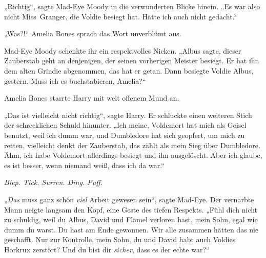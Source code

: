 „Richtig“, sagte Mad-Eye Moody in die verwunderten Blicke hinein.
„Es war also nicht Miss~Granger, die Voldie besiegt hat. Hätte ich auch nicht gedacht.“

„Was?!“ Amelia Bones sprach das Wort unverblümt aus.

Mad-Eye Moody schenkte ihr ein respektvolles Nicken.
„Albus sagte, dieser Zauberstab geht an denjenigen, der seinen vorherigen Meister besiegt. Er hat ihn dem alten Grindie abgenommen, das hat er getan. Dann besiegte Voldie Albus, gestern. Muss ich es buchstabieren, Amelia?“

Amelia Bones starrte Harry mit weit offenem Mund an.

„Das ist vielleicht nicht richtig“, sagte Harry. Er schluckte einen weiteren Stich der schrecklichen Schuld hinunter.
„Ich meine, Voldemort hat mich als Geisel benutzt, weil ich dumm war, und Dumbledore hat sich geopfert, um mich zu retten, vielleicht denkt der Zauberstab, das zählt als mein Sieg über Dumbledore. Ähm, ich habe Voldemort allerdings besiegt und ihn ausgelöscht. Aber ich glaube, es ist besser, wenn niemand weiß, dass ich da war.“

\emph{Biep. Tick. Surren. Ding. Puff.}

„\emph{Das} muss ganz schön \emph{viel} Arbeit gewesen sein“, sagte Mad-Eye. Der vernarbte Mann neigte langsam den Kopf, eine Geste des tiefen Respekts.
„Fühl dich nicht zu schuldig, weil du Albus, David und Flamel verloren hast, mein Sohn, egal wie dumm du warst. Du hast am Ende gewonnen. Wir alle zusammen hätten das nie geschafft. Nur zur Kontrolle, mein Sohn, du und David habt auch Voldies Horkrux zerstört? Und du bist dir \emph{sicher}, dass es der echte war?“

